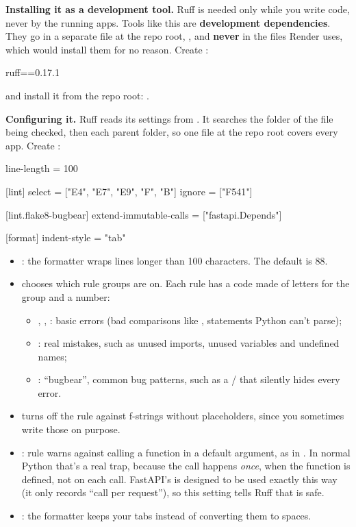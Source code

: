 \textbf{Installing it as a development tool.} Ruff is needed only while you write code, never by the running apps. Tools like this are \textbf{development dependencies}. They go in a separate file at the repo root, , and \textbf{never} in the  files Render uses, which would install them for no reason. Create :

\begin{code}
ruff==0.17.1
\end{code}

and install it from the repo root: .

\textbf{Configuring it.} Ruff reads its settings from . It searches the folder of the file being checked, then each parent folder, so one file at the repo root covers every app. Create :

\begin{code}
line-length = 100

[lint]
select = ["E4", "E7", "E9", "F", "B"]
ignore = ["F541"]

[lint.flake8-bugbear]
extend-immutable-calls = ["fastapi.Depends"]

[format]
indent-style = "tab"
\end{code}

\begin{itemize}
\item {}: the formatter wraps lines longer than 100 characters. The default is 88.
\item {} chooses which rule groups are on. Each rule has a code made of letters for the group and a number:
\begin{itemize}
\item {}, , : basic errors (bad comparisons like , statements Python can't parse);
\item {}: real mistakes, such as unused imports, unused variables and undefined names;
\item {}: ``bugbear'', common bug patterns, such as a / that silently hides every error.
\end{itemize}
\item {} turns off the rule against f-strings without placeholders, since you sometimes write those on purpose.
\item {}: rule  warns against calling a function in a default argument, as in . In normal Python that's a real trap, because the call happens \emph{once}, when the function is defined, not on each call. FastAPI's  is designed to be used exactly this way (it only records ``call  per request''), so this setting tells Ruff that  is safe.
\item {}: the formatter keeps your tabs instead of converting them to spaces.
\end{itemize}

